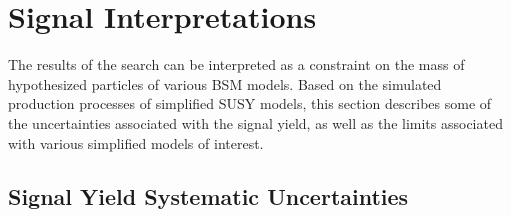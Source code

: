 \section{Signal Interpretations}
\label{sec:interpretations}

The results of the search can be interpreted as a constraint on the mass of hypothesized particles of various BSM models. Based on the simulated production processes of simplified SUSY models, this section describes some of the uncertainties associated with the signal yield, as well as the limits associated with various simplified models of interest.

\subsection{Signal Yield Systematic Uncertainties}
\label{subsec:signalSyst}

